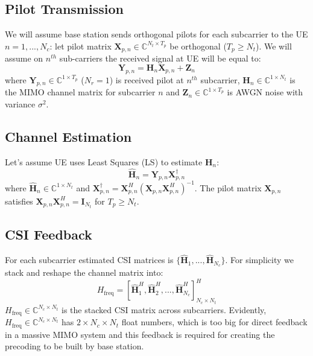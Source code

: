 \documentclass[lettersize,journal]{IEEEtran}
\begin{document}
\subsection{Pilot Transmission}
We will assume base station sends orthogonal pilots for each subcarrier to the UE $n=1,...,N_{c}$: let pilot matrix $\mathbf{X}_{p,n}\in \mathbb{C}^{N_{t}\times T_{p}}$ be orthogonal ($T_{p} \geq N_{t}$). We will assume on $n^{th}$ sub-carriers the received signal at UE will be equal to: 
\begin{equation}
	\mathbf{Y}_{p,n} = \mathbf{H}_{n}\mathbf{X}_{p,n} + \mathbf{Z}_{n}
	\label{eq:pilot_reception}
\end{equation}
where $\mathbf{Y}_{p,n} \in \mathbb{C}^{1\times T_{p}}$ ($N_{r}=1$) is received pilot at $n^{th}$ subcarrier, $\mathbf{H}_{n} \in \mathbb{C}^{1\times N_{t}}$ is the MIMO channel matrix for subcarrier $n$ and $\mathbf{Z}_{n}\in \mathbb{C}^{1\times T_{p}}$ is AWGN noise with variance $\sigma^{2}$.

\subsection{Channel Estimation}
Let's assume UE uses Least Squares (LS) to estimate $\mathbf{H}_{n}$:
\begin{equation}
	\hat{\mathbf{H}}_{n} = \mathbf{Y}_{p,n}\mathbf{X}^{\dagger}_{p,n}
	\label{eq:channel_estimation}
\end{equation}
where $\hat{\mathbf{H}}_{n} \in \mathbb{C}^{1\times N_{t}}$ and $\mathbf{X}_{p,n}^{\dag}= \mathbf{X}^{H}_{p,n}(\mathbf{X}_{p,n}\mathbf{X}^{H}_{p,n})^{-1}$. The pilot matrix $\mathbf{X}_{p,n}$ satisfies $\mathbf{X}_{p,n} \mathbf{X}_{p,n}^H = \mathbf{I}_{N_t}$ for $T_p \geq N_t$.

\subsection{CSI Feedback}
For each subcarrier estimated CSI matrices is $\{ \hat{\mathbf{H}}_{1},...,\hat{\mathbf{H}}_{N_{c}} \}$. For simplicity we stack and reshape the channel matrix into:
\[
H_{\text{freq}}=\left[\hat{\mathbf{H}}_{1}^{H},\hat{\mathbf{H}}_{2}^{H},...,\hat{\mathbf{H}}_{N_{c}}^{H}\right]^{H}_{N_{c}\times N_{t}}
\]
$H_{\text{freq}} \in \mathbb{C}^{N_c \times N_t}$ is the stacked CSI matrix across subcarriers. Evidently, $H_{\text{freq}} \in \mathbb{C}^{N_{c}\times N_{t}}$ has $2\times N_{c}\times N_{t}$ float numbers, which is too big for direct feedback in a massive MIMO system and this feedback is required for creating the precoding to be built by base station.
\end{document}

